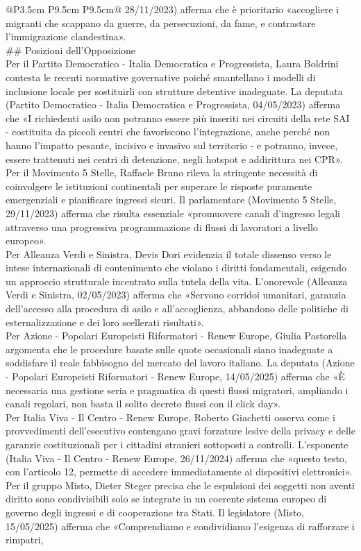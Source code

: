 \documentclass[a4paper,11pt]{article}
\begin{document}
\begin{landscape}
\begin{longtable}{@{}P{3.5cm} P{9.5cm} P{9.5cm}@{}}
28/11/2023) afferma che è prioritario «accogliere i migranti che scappano da guerre, da persecuzioni, da fame, e contrastare l'immigrazione clandestina».\\[6pt] \#\# Posizioni dell'Opposizione\\[6pt] Per il Partito Democratico - Italia Democratica e Progressista, Laura Boldrini contesta le recenti normative governative poiché smantellano i modelli di inclusione locale per sostituirli con strutture detentive inadeguate. La deputata (Partito Democratico - Italia Democratica e Progressista, 04/05/2023) afferma che «I richiedenti asilo non potranno essere più inseriti nei circuiti della rete SAI - costituita da piccoli centri che favoriscono l'integrazione, anche perché non hanno l'impatto pesante, incisivo e invasivo sul territorio - e potranno, invece, essere trattenuti nei centri di detenzione, negli hotspot e addirittura nei CPR».\\[6pt] Per il Movimento 5 Stelle, Raffaele Bruno rileva la stringente necessità di coinvolgere le istituzioni continentali per superare le risposte puramente emergenziali e pianificare ingressi sicuri. Il parlamentare (Movimento 5 Stelle, 29/11/2023) afferma che risulta essenziale «promuovere canali d'ingresso legali attraverso una progressiva programmazione di flussi di lavoratori a livello europeo».\\[6pt] Per Alleanza Verdi e Sinistra, Devis Dori evidenzia il totale dissenso verso le intese internazionali di contenimento che violano i diritti fondamentali, esigendo un approccio strutturale incentrato sulla tutela della vita. L'onorevole (Alleanza Verdi e Sinistra, 02/05/2023) afferma che «Servono corridoi umanitari, garanzia dell'accesso alla procedura di asilo e all'accoglienza, abbandono delle politiche di esternalizzazione e dei loro scellerati risultati».\\[6pt] Per Azione - Popolari Europeisti Riformatori - Renew Europe, Giulia Pastorella argomenta che le procedure basate sulle quote occasionali siano inadeguate a soddisfare il reale fabbisogno del mercato del lavoro italiano. La deputata (Azione - Popolari Europeisti Riformatori - Renew Europe, 14/05/2025) afferma che «È necessaria una gestione seria e pragmatica di questi flussi migratori, ampliando i canali regolari, non basta il solito decreto flussi con il click day».\\[6pt] Per Italia Viva - Il Centro - Renew Europe, Roberto Giachetti osserva come i provvedimenti dell'esecutivo contengano gravi forzature lesive della privacy e delle garanzie costituzionali per i cittadini stranieri sottoposti a controlli. L'esponente (Italia Viva - Il Centro - Renew Europe, 26/11/2024) afferma che «questo testo, con l'articolo 12, permette di accedere immediatamente ai dispositivi elettronici».\\[6pt] Per il gruppo Misto, Dieter Steger precisa che le espulsioni dei soggetti non aventi diritto sono condivisibili solo se integrate in un coerente sistema europeo di governo degli ingressi e di cooperazione tra Stati. Il legislatore (Misto, 15/05/2025) afferma che «Comprendiamo e condividiamo l'esigenza di rafforzare i rimpatri, 
\end{longtable}
\end{landscape}
\end{document}
